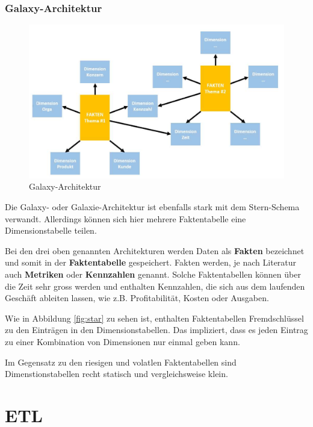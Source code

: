 \documentclass[a4paper, 11pt]{article}
\begin{document}
\subsubsection{Galaxy-Architektur}

\begin{figure}
	\centering
	\includegraphics[keepaspectratio=true,height=15\baselineskip]{galaxy.PNG}
	\caption{Galaxy-Architektur}
	\label{fig:galaxy}
\end{figure}

Die Galaxy- oder Galaxie-Architektur ist ebenfalls stark mit dem Stern-Schema verwandt. Allerdings können sich hier mehrere Faktentabelle eine Dimensionstabelle teilen.

\vspace{20px}

\noindent Bei den drei oben genannten Architekturen werden Daten als \textbf{Fakten} bezeichnet und somit in der \textbf{Faktentabelle} gespeichert. Fakten werden, je nach Literatur auch \textbf{Metriken} oder \textbf{Kennzahlen} genannt. Solche Faktentabellen können über die Zeit sehr gross werden und enthalten Kennzahlen, die sich aus dem laufenden Geschäft ableiten lassen, wie z.B. Profitabilität, Kosten oder Ausgaben.

Wie in Abbildung \ref{fig:star} zu sehen ist, enthalten Faktentabellen Fremdschlüssel zu den Einträgen in den Dimensionstabellen. Das impliziert, dass es jeden Eintrag zu einer Kombination von Dimensionen nur einmal geben kann.

Im Gegensatz zu den riesigen und volatlen Faktentabellen sind Dimenstionstabellen recht statisch und vergleichsweise klein. 

\section{ETL}
\end{document}
